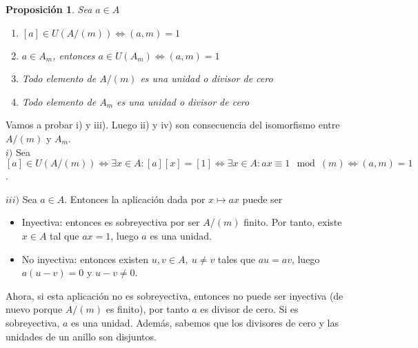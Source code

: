 \documentclass[11pt, a4paper, titlepage]{article}
\makeatletter
\newif\IfInSansMode
\let\oldsf\sffamily
\renewcommand*{\sffamily}{\oldsf\mathversion{sans}\InSansModetrue}
\let\oldnorm\normalfont
\renewcommand*{\normalfont}{\oldnorm\InSansModefalse\mathversion{normal}}
\renewenvironment{proof}[1][\proofname] {\vspace{-15pt}\par\pushQED{\qed}\normalfont\topsep6\p@\@plus6\p@\relax\trivlist\item[\hskip\labelsep\it#1\@addpunct{.}]\ignorespaces}{\popQED\endtrivlist\@endpefalse}
\renewenvironment{proof}[1][\proofname] {\par\pushQED{\qed}\normalfont\topsep6\p@\@plus6\p@\relax\trivlist\item[\hskip\labelsep\itshape\sffamily#1\@addpunct{.}]\ignorespaces}{\popQED\endtrivlist\@endpefalse}
\theoremstyle{theorem-style}
\newtheorem{nprop}{Proposición}[section]
\theoremstyle{definition-style}
\theoremstyle{remark-style}
\theoremstyle{example-style}
\newenvironment{nlist}
{\begin{enumerate}
\renewcommand\labelenumi{(\emph{\roman{enumi})}}}
{\end{enumerate}}
\makeatother
\begin{document}
\begin{nprop} Sea $a \in A$
	\begin{nlist}
	\item $[a] \in U(A/(m)) \iff (a,m) = 1 $
	\item $a \in A_m$, entonces $a \in U(A_m) \iff (a,m) = 1$
	\item Todo elemento de $A/(m)$ es una unidad o divisor de cero
	\item Todo elemento de $A_m$ es una unidad o divisor de cero
\end{nlist}
\end{nprop}
\begin{proof}
	Vamos a probar i) y iii). Luego ii) y iv) son consecuencia del isomorfismo entre $A/(m)$ y $A_m$.\\

        $\boxed{i)}$ Sea $[a] \in U(A/(m)) \iff \exists x \in A: [a][x] = [1] \iff \exists x \in A : ax \equiv 1\mod(m) \iff (a,m) = 1$.
	
	$\boxed{iii)}$ Sea $a \in A$. Entonces la aplicación dada por $x \mapsto ax$ puede ser

        \begin{itemize}
        \item Inyectiva: entonces es sobreyectiva por ser $A/(m)$ finito. Por tanto, existe $x \in A$ tal que $ax = 1$, luego $a$ es una unidad.
        \item No inyectiva: entonces existen $u,v \in A, \ u \ne v$ tales que $au = av$, luego $a(u-v) = 0$ y $u-v \ne 0$.
        \end{itemize}

        Ahora, si esta aplicación no es sobreyectiva, entonces no puede ser inyectiva (de nuevo porque $A/(m)$ es finito), por tanto $a$ es divisor de cero.
        Si es sobreyectiva, $a$ es una unidad. Además, sabemos que los divisores de cero y las unidades de un anillo son disjuntos.
\end{proof}
\end{document}
